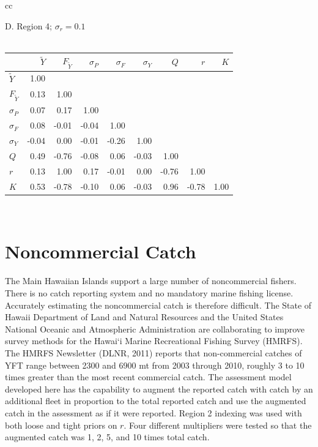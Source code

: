 \documentclass[12pt,letterpaper]{article}
\newcommand\MSY{\widetilde{Y}}
\newcommand\Fmsy{F_{\MSY}}
\begin{document}
\begin{table}
\begin{tabular}[h]{cc}
\begin{minipage}[t]{0.5\textwidth}
\begin{center}
{\normalsize D. Region 4; $\sigma_r = 0.1$}\\
~\\
\begin{tabular}{|lrrrrrrrr|}
\hline
&$\MSY$&$\Fmsy$&$\sigma_P$&$\sigma_F$&$\sigma_Y$&$Q$&$r$&$K$\\
\hline
$\MSY$&1.00&&&&&&&\\
$\Fmsy$&0.13&1.00&&&&&&\\
$\sigma_P$&0.07&0.17&1.00&&&&&\\
$\sigma_F$&0.08&-0.01&-0.04&1.00&&&&\\
$\sigma_Y$&-0.04&0.00&-0.01&-0.26&1.00&&&\\
$Q$&0.49&-0.76&-0.08&0.06&-0.03&1.00&&\\
$r$&0.13&1.00&0.17&-0.01&0.00&-0.76&1.00&\\
$K$&0.53&-0.78&-0.10&0.06&-0.03&0.96&-0.78&1.00\\
\hline
\end{tabular}
\end{center}
      \end{minipage}\\
   \end{tabular}%
\end{table}


\clearpage
\section{Noncommercial Catch}
\label{sec:klingon}
The Main Hawaiian Islands support a large number of noncommercial
fishers. There is no catch reporting system and no mandatory marine fishing
license. 
Accurately estimating the noncommercial catch is therefore difficult. 
The State of Hawaii Department of Land and Natural Resources and the
United States National Oceanic and Atmospheric Administration are  
collaborating to improve survey methods for the Hawai`i Marine
Recreational Fishing Survey (HMRFS). The HMRFS Newsletter (DLNR, 2011)
reports that non-commercial catches of YFT range between 2300 and 6900
mt from 2003 through 2010,  roughly 3 to 10 times greater than the most recent
commercial catch. The assessment model developed here has the capability to
augment the reported catch with catch by an additional fleet in
proportion to the total reported catch and use the augmented catch in
the assessment as if it were reported. Region 2 indexing was used with
both loose and tight priors on $r$.  Four different multipliers
were tested so that the augmented catch was 1, 2, 5, and 10 times total catch.
\end{document}
